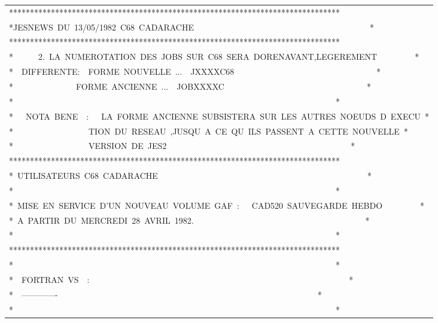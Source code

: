 
{\scriptsize\ttfamily\begin{tabular}{@{}l@{}}
*******************************************************************************\\
*JESNEWS~DU~13/05/1982~C68~CADARACHE~~~~~~~~~~~~~~~~~~~~~~~~~~~~~~~~~~~~~~~~~~*\\
*******************************************************************************\\
*~~~~~~2.~LA~NUMEROTATION~DES~JOBS~SUR~C68~SERA~DORENAVANT,LEGEREMENT~~~~~~~~~*\\
*~~DIFFERENTE:~~FORME~NOUVELLE~...~~JXXXXC68~~~~~~~~~~~~~~~~~~~~~~~~~~~~~~~~~~*\\
*~~~~~~~~~~~~~~~FORME~ANCIENNE~...~~JOBXXXXC~~~~~~~~~~~~~~~~~~~~~~~~~~~~~~~~~~*\\
*~~~~~~~~~~~~~~~~~~~~~~~~~~~~~~~~~~~~~~~~~~~~~~~~~~~~~~~~~~~~~~~~~~~~~~~~~~~~~*\\
*~~~NOTA~BENE~~:~~~LA~FORME~ANCIENNE~SUBSISTERA~SUR~LES~AUTRES~NOEUDS~D~EXECU~*\\
*~~~~~~~~~~~~~~~~~~TION~DU~RESEAU~,JUSQU~A~CE~QU~ILS~PASSENT~A~CETTE~NOUVELLE~*\\
*~~~~~~~~~~~~~~~~~~VERSION~DE~JES2~~~~~~~~~~~~~~~~~~~~~~~~~~~~~~~~~~~~~~~~~~~~*\\
*******************************************************************************\\
*~UTILISATEURS~C68~CADARACHE~~~~~~~~~~~~~~~~~~~~~~~~~~~~~~~~~~~~~~~~~~~~~~~~~~*\\
*~~~~~~~~~~~~~~~~~~~~~~~~~~~~~~~~~~~~~~~~~~~~~~~~~~~~~~~~~~~~~~~~~~~~~~~~~~~~~*\\
*~MISE~EN~SERVICE~D'UN~NOUVEAU~VOLUME~GAF~:~~~CAD520~SAUVEGARDE~HEBDO~~~~~~~~~*\\
*~A~PARTIR~DU~MERCREDI~28~AVRIL~1982.~~~~~~~~~~~~~~~~~~~~~~~~~~~~~~~~~~~~~~~~~*\\
*~~~~~~~~~~~~~~~~~~~~~~~~~~~~~~~~~~~~~~~~~~~~~~~~~~~~~~~~~~~~~~~~~~~~~~~~~~~~~*\\
*******************************************************************************\\
*~~~~~~~~~~~~~~~~~~~~~~~~~~~~~~~~~~~~~~~~~~~~~~~~~~~~~~~~~~~~~~~~~~~~~~~~~~~~~*\\
*~~FORTRAN~VS~~:~~~~~~~~~~~~~~~~~~~~~~~~~~~~~~~~~~~~~~~~~~~~~~~~~~~~~~~~~~~~~~*\\
*~~-------------~~~~~~~~~~~~~~~~~~~~~~~~~~~~~~~~~~~~~~~~~~~~~~~~~~~~~~~~~~~~~~*\\
*~~~~~~~~~~~~~~~~~~~~~~~~~~~~~~~~~~~~~~~~~~~~~~~~~~~~~~~~~~~~~~~~~~~~~~~~~~~~~*\\

\end{tabular}}
